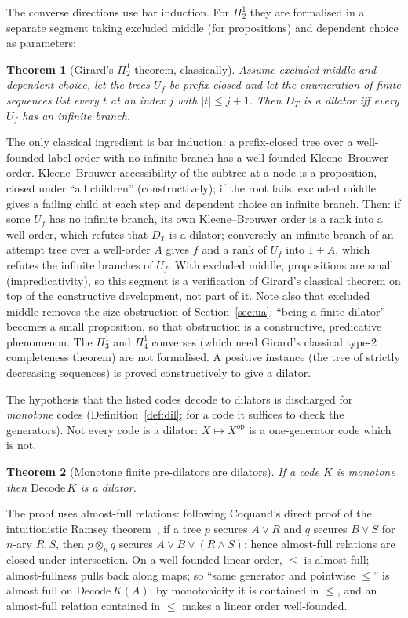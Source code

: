 \documentclass[11pt]{article}
\newtheorem{theorem}{Theorem}[section]
\theoremstyle{definition}
\theoremstyle{remark}
\begin{document}
The converse directions use bar induction. For $\Pi^1_2$ they are
formalised in a separate segment taking excluded middle (for
propositions) and dependent choice as parameters:

\begin{theorem}[Girard's $\Pi^1_2$ theorem, classically]
Assume excluded middle and dependent choice, let the trees $U_f$ be
prefix-closed and let the enumeration of finite sequences list every $t$ at
an index $j$ with $|t|\le j+1$. Then $D_T$ is a dilator iff every $U_f$ has
an infinite branch.
\end{theorem}

The only classical ingredient is bar induction: a prefix-closed tree over a
well-founded label order with no infinite branch has a well-founded
Kleene--Brouwer order. Kleene--Brouwer accessibility of the subtree at a
node is a proposition, closed under ``all children'' (constructively);
if the root fails, excluded middle gives a failing child at each step and
dependent choice an infinite branch. Then: if some $U_f$ has no infinite
branch, its own Kleene--Brouwer order is a rank into a well-order, which
refutes that $D_T$ is a dilator; conversely an infinite branch of an
attempt tree over a well-order $A$ gives $f$ and a rank of $U_f$ into
$1+A$, which refutes the infinite branches of $U_f$. With excluded middle,
propositions are small (impredicativity), so this segment is a
verification of Girard's classical theorem on top of the constructive
development, not part of it. Note also that excluded middle removes the
size obstruction of Section~\ref{sec:ua}: ``being a finite dilator''
becomes a small proposition, so that obstruction is a constructive,
predicative phenomenon. The $\Pi^1_3$ and $\Pi^1_4$ converses (which
need Girard's classical type-2 completeness theorem) are not formalised.
A positive instance (the tree of strictly decreasing sequences) is proved
constructively to give a dilator.

The hypothesis that the listed codes decode to dilators is discharged
for \emph{monotone} codes (Definition~\ref{def:dil}; for a code it suffices
to check the generators). Not every code is a dilator:
$X\mapsto X^{\mathrm{op}}$ is a one-generator code which is not.

\begin{theorem}[Monotone finite pre-dilators are dilators]
If a code $K$ is monotone then $\mathrm{Decode}\,K$ is a dilator.
\end{theorem}

The proof uses almost-full relations: following Coquand's direct proof of
the intuitionistic Ramsey theorem~\cite{CoqRamsey}, if a tree $p$ secures
$A\vee R$ and $q$ secures $B\vee S$ for $n$-ary $R,S$, then $p\otimes_n q$
secures $A\vee B\vee(R\wedge S)$; hence almost-full relations are closed
under intersection. On a well-founded linear order, $\le$ is almost full;
almost-fullness pulls back along maps; so ``same generator and pointwise
$\le$'' is almost full on $\mathrm{Decode}\,K(A)$; by monotonicity it is
contained in $\le$, and an almost-full relation contained in $\le$ makes a
linear order well-founded.
\end{document}
